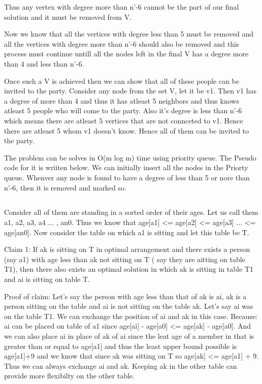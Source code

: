 \documentclass{article}
\begin{document}
Thus any vertex with degree more than n'-6 cannot be the part of our final solution and it must be removed from V.

Now we know that all the vertices with degree less than 5 must be removed and all the vertices with degree more than n'-6 should also be removed and this process must continue untill all the nodes left in the final V has a degree more than 4 and less than n'-6. 

Once such a V is achieved then we can show that all of these people can be invited to the party. Consider any node from the set V, let it be v1. Then v1 has a degree of more than 4 and thus it has atleast 5 neighbors and thus knows atleast 5 people who will come to the party. Also it's degree is less than n'-6 which means there are atleast 5 vertices that are not connceted to v1. Hence there are atleast 5 whom v1 doesn't know. Hence all of them can be invited to the party.

The problem can be solves in O(m log m) time using priority queue. The Pseudo code for it is wriiten below. We can initially insert all the nodes in the Priorty queue. Whenver any node is found to have a degree of less than 5 or nore than n'-6, then it is removed and marked so.  

\subsection{}

Consider all of them are standing in a sorted order of their ages. Let us call them a1, a2, a3, a4 ... , an0.  Thus we know that age[a1] <= age[a2] <= age[a3] ... <= age[an0]. Now consider the table on which a1 is sitting and let this table be T.

Claim 1: If ak is sitting on T in optimal arrangement and there exists a person (say a1) with age less than ak not sitting on T ( say they are aitting on table T1), then there also exists an optimal solution in which ak is sitting in table T1 and ai is sitting on table T.

Proof of claim: Let's say the person with age less than that of ak is ai, ak is a person sitting on the table and ai is not sitting on the table ak. Let's say ai was on the table T1. We can exchange the position of ai and ak in this case. Because: ai can be placed on table of a1 since age[ai] - age[a0] <= age[ak] - age[a0]. And we can also place ai in place of ak of ai since the leat age of a member in that is greater than or equal to age[a1] and thus the least upper bound possible is age[a1]+9 and we know that since ak was sitting on T so age[ak] <= age[a1] + 9. Thus we can always exchange ai and ak. Keeping ak in the other table can provide more flexibilty on the other table.
\end{document}
